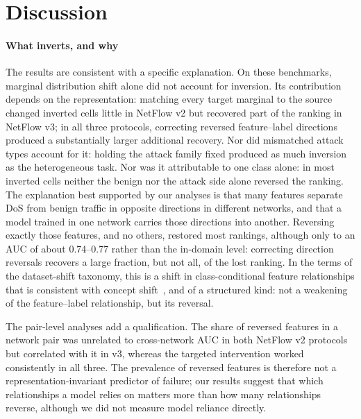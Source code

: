 \documentclass[preprint,12pt]{elsarticle}
\begin{document}
\section{Discussion}
\label{sec:discussion}

\paragraph{What inverts, and why}
The results are consistent with a specific explanation. On these benchmarks, marginal distribution shift alone did not account for inversion. Its contribution depends on the representation: matching every target marginal to the source changed inverted cells little in NetFlow v2 but recovered part of the ranking in NetFlow v3; in all three protocols, correcting reversed feature--label directions produced a substantially larger additional recovery. Nor did mismatched attack types account for it: holding the attack family fixed produced as much inversion as the heterogeneous task. Nor was it attributable to one class alone: in most inverted cells neither the benign nor the attack side alone reversed the ranking. The explanation best supported by our analyses is that many features separate DoS from benign traffic in opposite directions in different networks, and that a model trained in one network carries those directions into another. Reversing exactly those features, and no others, restored most rankings, although only to an AUC of about 0.74--0.77 rather than the in-domain level: correcting direction reversals recovers a large fraction, but not all, of the lost ranking. In the terms of the dataset-shift taxonomy, this is a shift in class-conditional feature relationships that is consistent with concept shift~\cite{gama2014survey,morenotorres2012unifying}, and of a structured kind: not a weakening of the feature--label relationship, but its reversal.

The pair-level analyses add a qualification. The share of reversed features in a network pair was unrelated to cross-network AUC in both NetFlow v2 protocols but correlated with it in v3, whereas the targeted intervention worked consistently in all three. The prevalence of reversed features is therefore not a representation-invariant predictor of failure; our results suggest that which relationships a model relies on matters more than how many relationships reverse, although we did not measure model reliance directly.
\end{document}
